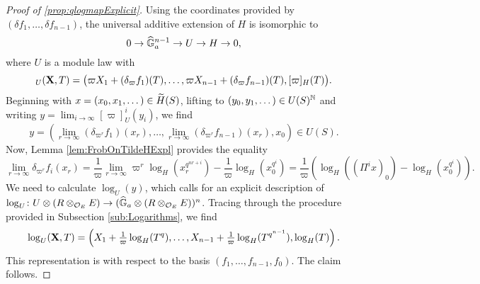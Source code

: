 \documentclass[../main.tex]{subfiles}
\begin{document}
\begin{proof}[Proof of \cref{prop:qlogmapExplicit}]
  Using the coordinates provided by $(\delta f_1, \dots, \delta f_{n-1})$, the
  universal additive extension of $H$ is isomorphic to 
  \begin{equation*}
    0 \to \Ghat_a^{n-1} \to U \to H \to 0,
  \end{equation*}
  where $U$ is a module law with 
  \begin{equation*}
    [\varpi]_U(\bX, T) = \big(\varpi X_1 + (\delta_{\varpi}f_1)(T), \dots, \varpi X_{n-1} + 
    (\delta_{\varpi}f_{n-1})(T), [\varpi]_H(T)\big).
  \end{equation*}
  Beginning with $x = (x_0, x_1, \dots) \in \Tilde H (S)$, lifting to $(y_0,
  y_1, \dots) \in U(S)^\N$ 
  and writing $y = \lim_{i\to\infty} [\varpi]_U^i (y_i)$, we find
  \begin{equation*}
    y = \left(\lim_{r\to\infty} (\delta_{\varpi^r} f_1)(x_r), \dots, \lim_{r\to \infty}
    (\delta_{\varpi^r}f_{n-1})(x_r), x_0\right) \in U(S).
  \end{equation*}
  Now, Lemma \ref{lem:FrobOnTildeHExpl} provides the equality
  $$\lim_{r\to\infty}\delta_{\varpi^r} f_i(x_r) = \frac 1\varpi \lim_{r \to \infty}
  \varpi^r \log_H(x_r^{q^{nr+i}}) - \frac 1\varpi \log_H\left(x_0^{q^i}\right) = 
  \frac 1\varpi \left(\log_H((\Pi^i x)_0)- \log_H(x_0^{q^i})\right).$$
  We need to calculate $\log_U(y)$, which calls for an explicit description of 
  $\log_U \colon U \otimes (R \otimes_{\cO_E}E) \to (\Ghat_a \otimes(R \otimes_{\cO_E} E))^n$. 
  Tracing through the procedure provided in Subsection \ref{sub:Logarithms},
  we find
  \begin{equation*}
    \log_U(\bX, T) = \left(X_1 + \tfrac 1\varpi \log_H(T^q), \dots, 
    X_{n-1} + \tfrac 1\varpi \log_H(T^{q^{n-1}}), \log_H(T)\right).
  \end{equation*}
  This representation is with respect to the basis $(f_1, \dots, f_{n-1}, f_0)$. 
  The claim follows.
\end{proof}

\end{document}
